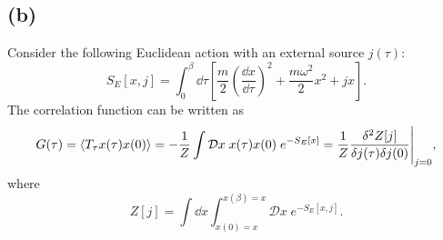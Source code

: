 \documentclass{article}
\begin{document}
\subsection*{(b)}
Consider the following Euclidean action with an external source $j(\tau)$:
\begin{equation}
    S_E[x,j] = \int_0^{\beta} \dd{\tau} \left[ \frac{m}{2} \left( \frac{\dd{x}}{\dd{\tau}} \right)^2 + \frac{m\omega^2}{2} x^2 + jx \right].
\end{equation}
The correlation function can be written as
\begin{equation}
    G(\tau)=\expval{T_\tau x(\tau)x(0)}=-\frac{1}{Z}\int \mathcal{D}x \; x(\tau)x(0) \; e^{-S_E[x]}=\frac{1}{Z}\frac{\delta^2 Z[j]}{\delta j(\tau)\delta j(0)}\Bigg|_{j=0},
\end{equation}
where
\begin{equation}
    Z[j] =\int\dd{x} \int_{x(0)=x}^{x(\beta)=x} \mathcal{D}x \; e^{-S_E[x,j]}.
\end{equation}
\end{document}
